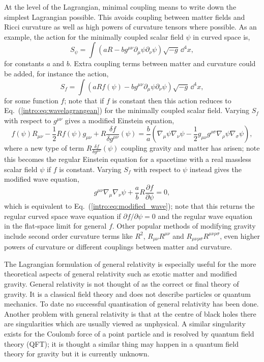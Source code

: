 At the level of the Lagrangian, minimal coupling means to write down the simplest Lagrangian possible. This avoids coupling between matter fields and Ricci curvature as well as high powers of curvature tensors where possible. As an example, the action for the minimally coupled scalar field $\psi$ in curved space is,
\begin{equation}
S_\psi = \int \left( aR - b g^{\mu\nu}\partial_\mu \psi \partial_\nu \psi \right) \sqrt{-g}\,\dd^4 x, \label{intro:eq:wavelagrangean}
\end{equation}
for constants $a$ and $b$. Extra coupling terms between matter and curvature could be added, for instance the action,
\begin{equation}
S_f = \int \left( aRf(\psi) - b g^{\mu\nu}\partial_\mu \psi \partial_\nu \psi \right) \sqrt{-g}\,\dd^4 x,
\end{equation}
for some function $f$; note that if $f$ is constant then this action reduces to Eq.~(\ref{intro:eq:wavelagrangean}) for the minimally coupled scalar field. Varying $S_f$ with respect to $g^{\mu\nu}$ gives a modified Einstein equation,
\begin{equation}
f(\psi) R_{\mu\nu} - \frac{1}{2} R f(\psi)g_{\mu\nu} + R \frac{\delta f}{\delta g^{\mu\nu}}(\psi) = \frac{b}{a} \left(\nabla_\mu \psi \nabla_\nu \psi-\frac{1}{2} g_{\mu\nu} g^{\rho\sigma}\nabla_\rho \psi \nabla_\sigma\psi  \right), 
\end{equation}
where a new type of term $ R \frac{\delta f}{\delta g^{\mu\nu}}(\psi)$ coupling gravity and matter has arisen; note this becomes the regular Einstein equation for a spacetime with a real massless scalar field $\psi$ if $f$ is constant. Varying $S_f$ with respect to $\psi$ instead gives the modified wave equation,
\begin{equation}
g^{\mu\nu}\nabla_\mu \nabla_\nu \psi + \frac{a}{b}R \frac{\partial f}{\partial \psi} =0,
\end{equation}
which is equivalent to Eq.~(\ref{intro:eq:modified_wave}); note that this returns the regular curved space wave equation if $\partial f / \partial \psi=0$ and the regular wave equation in the flat-space limit for general $f$. Other popular methods of modifying gravity include second order curvature terms like $R^2$, $R_{\mu\nu}R^{\mu\nu}$ and $R_{\mu\nu\rho\sigma}R^{\mu\nu\rho\sigma}$, even higher powers of curvature or different couplings between matter and curvature.

The Lagrangian formulation of general relativity is especially useful for the more theoretical aspects of general relativity such as exotic matter and modified gravity. General relativity is not thought of as the correct or final theory of gravity. It is a classical field theory and does not describe particles or quantum mechanics. To date no successful quantisation of general relativity has been done. Another problem with general relativity is that at the centre of black holes there are singularities which are usually viewed as unphysical. A similar singularity exists for the Coulomb force of a point particle and is resolved by quantum field theory (QFT); it is thought a similar thing may happen in a quantum field theory for gravity but it is currently unknown.

